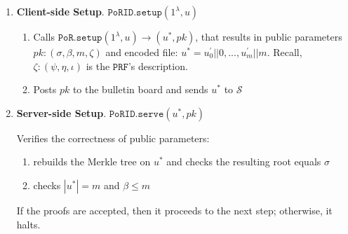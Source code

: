 

\begin{enumerate}
\item\textbf{Client-side Setup}. $\mathtt{PoRID.setup}(1^{\lambda}, u)$
\begin{enumerate}
\item Calls  $\mathtt{PoR.setup}(1^{\lambda}, u)\rightarrow (u^{\scriptscriptstyle *},pk)$, that results in public parameters $pk:(\sigma,\beta,m,\zeta)$ and encoded file: $u^{\scriptscriptstyle *}=u^{\scriptscriptstyle '}_{\scriptscriptstyle 0}||0,...,u^{\scriptscriptstyle '}_{\scriptscriptstyle m}||m$. Recall,  $\zeta:(\psi,\eta, \iota)$ is the $\mathtt{PRF}$'s description.

\item Posts $pk$ to the bulletin board and sends $u^{\scriptscriptstyle *}$ to $\mathcal{S}$ 
\end{enumerate}

\item\textbf{Server-side Setup}. $\mathtt{PoRID.serve}(u^{\scriptscriptstyle *},pk)$

Verifies the correctness of public parameters:
\begin{enumerate}
\item rebuilds  the Merkle tree on $u^{\scriptscriptstyle *}$ and checks the resulting root equals $\sigma$
\item checks $|u^{*}|=m$ and  $\beta\leq m$
\end{enumerate}
 If the proofs are accepted, then it proceeds to the next step; otherwise, it halts.
 


\end{enumerate}
